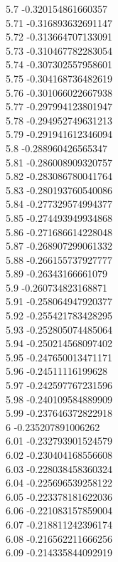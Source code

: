 {5.7	-0.320154861660357\\
5.71	-0.316893632691147\\
5.72	-0.313664707133091\\
5.73	-0.310467782283054\\
5.74	-0.307302557958601\\
5.75	-0.304168736482619\\
5.76	-0.301066022667938\\
5.77	-0.297994123801947\\
5.78	-0.294952749631213\\
5.79	-0.291941612346094\\
5.8	-0.288960426565347\\
5.81	-0.286008909320757\\
5.82	-0.283086780041764\\
5.83	-0.280193760540086\\
5.84	-0.277329574994377\\
5.85	-0.274493949934868\\
5.86	-0.271686614228048\\
5.87	-0.268907299061332\\
5.88	-0.266155737927777\\
5.89	-0.26343166661079\\
5.9	-0.260734823168871\\
5.91	-0.258064947920377\\
5.92	-0.255421783428295\\
5.93	-0.252805074485064\\
5.94	-0.250214568097402\\
5.95	-0.247650013471171\\
5.96	-0.24511116199628\\
5.97	-0.242597767231596\\
5.98	-0.240109584889909\\
5.99	-0.237646372822918\\
6	-0.235207891006262\\
6.01	-0.232793901524579\\
6.02	-0.230404168556608\\
6.03	-0.228038458360324\\
6.04	-0.225696539258122\\
6.05	-0.223378181622036\\
6.06	-0.221083157859004\\
6.07	-0.218811242396174\\
6.08	-0.216562211666256\\
6.09	-0.214335844092919\\
}
